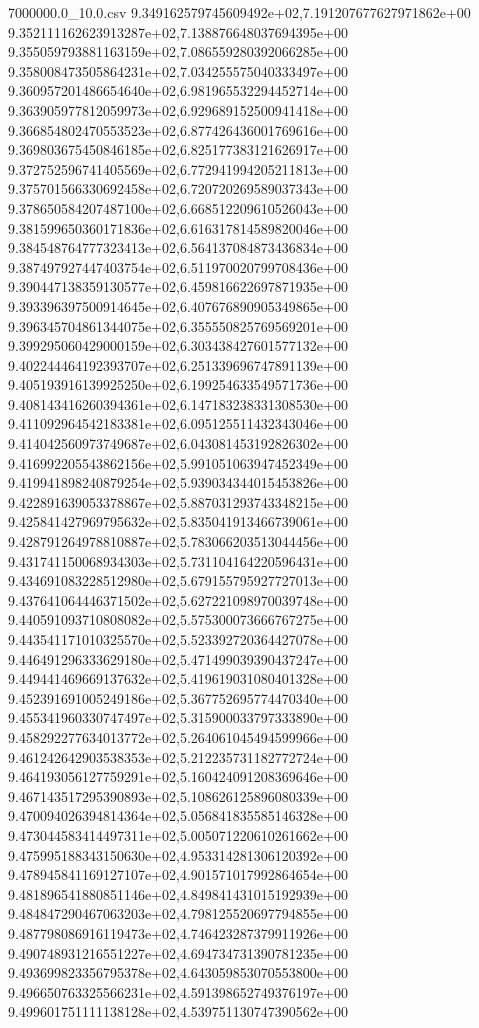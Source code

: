 \begin{filecontents*}{7000000.0_10.0.csv}
9.349162579745609492e+02,7.191207677627971862e+00
9.352111162623913287e+02,7.138876648037694395e+00
9.355059793881163159e+02,7.086559280392066285e+00
9.358008473505864231e+02,7.034255575040333497e+00
9.360957201486654640e+02,6.981965532294452714e+00
9.363905977812059973e+02,6.929689152500941418e+00
9.366854802470553523e+02,6.877426436001769616e+00
9.369803675450846185e+02,6.825177383121626917e+00
9.372752596741405569e+02,6.772941994205211813e+00
9.375701566330692458e+02,6.720720269589037343e+00
9.378650584207487100e+02,6.668512209610526043e+00
9.381599650360171836e+02,6.616317814589820046e+00
9.384548764777323413e+02,6.564137084873436834e+00
9.387497927447403754e+02,6.511970020799708436e+00
9.390447138359130577e+02,6.459816622697871935e+00
9.393396397500914645e+02,6.407676890905349865e+00
9.396345704861344075e+02,6.355550825769569201e+00
9.399295060429000159e+02,6.303438427601577132e+00
9.402244464192393707e+02,6.251339696747891139e+00
9.405193916139925250e+02,6.199254633549571736e+00
9.408143416260394361e+02,6.147183238331308530e+00
9.411092964542183381e+02,6.095125511432343046e+00
9.414042560973749687e+02,6.043081453192826302e+00
9.416992205543862156e+02,5.991051063947452349e+00
9.419941898240879254e+02,5.939034344015453826e+00
9.422891639053378867e+02,5.887031293743348215e+00
9.425841427969795632e+02,5.835041913466739061e+00
9.428791264978810887e+02,5.783066203513044456e+00
9.431741150068934303e+02,5.731104164220596431e+00
9.434691083228512980e+02,5.679155795927727013e+00
9.437641064446371502e+02,5.627221098970039748e+00
9.440591093710808082e+02,5.575300073666767275e+00
9.443541171010325570e+02,5.523392720364427078e+00
9.446491296333629180e+02,5.471499039390437247e+00
9.449441469669137632e+02,5.419619031080401328e+00
9.452391691005249186e+02,5.367752695774470340e+00
9.455341960330747497e+02,5.315900033797333890e+00
9.458292277634013772e+02,5.264061045494599966e+00
9.461242642903538353e+02,5.212235731182772724e+00
9.464193056127759291e+02,5.160424091208369646e+00
9.467143517295390893e+02,5.108626125896080339e+00
9.470094026394814364e+02,5.056841835585146328e+00
9.473044583414497311e+02,5.005071220610261662e+00
9.475995188343150630e+02,4.953314281306120392e+00
9.478945841169127107e+02,4.901571017992864654e+00
9.481896541880851146e+02,4.849841431015192939e+00
9.484847290467063203e+02,4.798125520697794855e+00
9.487798086916119473e+02,4.746423287379911926e+00
9.490748931216551227e+02,4.694734731390781235e+00
9.493699823356795378e+02,4.643059853070553800e+00
9.496650763325566231e+02,4.591398652749376197e+00
9.499601751111138128e+02,4.539751130747390562e+00

\end{filecontents*}
